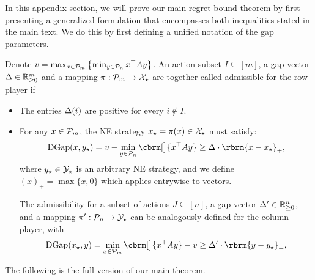 In this appendix section, we will prove our main regret bound theorem by first presenting a generalized formulation that encompasses both inequalities stated in the main text. We do this by first defining a unified notation of the gap parameters.

\begin{definition}\label{def:admissble}
    Denote $v = \max_{x \in \mathcal{P}_m}\left\{ \min_{y \in \mathcal{P}_n} x^\top A y \right\}$.
    An action subset $I\subseteq [m]$, a gap vector $\Delta\in \mathbb{R}_{\geq 0}^m$ and a mapping $\pi : \mathcal{P}_m\to \mathcal{X}_{\star}$ are together called {admissible} for the row player if
    \begin{itemize}[leftmargin=*]
    \item The entries $\Delta(i)$ are positive for every $i\not\in I$. %
    \item For any $x\in \mathcal{P}_m$, the NE strategy $x_{\star}=\pi(x)\in \mathcal{X}_{\star}$ must satisfy:
    \begin{equation}
        \DG(x, \ystar) = v - \min_{y\in \cP_n}\cbrm[\big]{x^\top A y} \geq \Deltar \cdot \rbrm{ x - \xstar }_+, \label{eq:def-Delta-r}
    \end{equation}
where $y_{\star}\in\mathcal{Y}_{\star}$ is an arbitrary NE strategy, and we define $(x)_+ = \max\{ x, 0 \}$ which applies entrywise to vectors.


The admissibility for a subset of actions $J\subseteq [n]$, a gap vector $\Delta'\in \mathbb{R}_{\geq 0}^n$, and a mapping $\pi' : \mathcal{P}_n\to\mathcal{Y}_{\star}$ can be analogously defined for the column player, with
\begin{equation}
        \DG(\xstar, y) = \min_{x\in \cP_m}\cbrm[\big]{x^\top A y} - v  \geq \Deltac \cdot \rbrm{ y - \ystar }_+, \label{eq:def-Delta-c}
\end{equation}
\end{itemize}
\end{definition}



The following is the full version of our main theorem.

